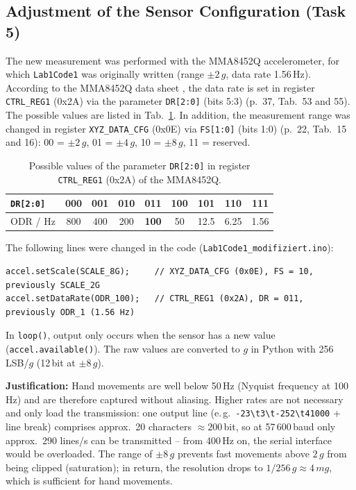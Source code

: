 \documentclass[a4paper,oneside,10pt]{article}
\begin{document}
\subsection{Adjustment of the Sensor Configuration (Task 5)}

The new measurement was performed with the MMA8452Q accelerometer, for which
\texttt{Lab1Code1} was originally written (range $\pm 2\,g$, data rate
1.56\,Hz). According to the MMA8452Q data sheet \cite{mma8452q}, the data rate is set in register
\texttt{CTRL\_REG1} (0x2A) via the parameter \texttt{DR[2:0]} (bits 5:3)
(p.~37, Tab.~53 and 55). The possible values are listed in Tab.~\ref{tab:odr}.
In addition, the measurement range was changed in register \texttt{XYZ\_DATA\_CFG} (0x0E) via
\texttt{FS[1:0]} (bits 1:0) (p.~22, Tab.~15 and 16): 00 = $\pm 2\,g$, 01 = $\pm 4\,g$,
10 = $\pm 8\,g$, 11 = reserved.

\begin{table}[H]
\centering
\small
\caption{Possible values of the parameter \texttt{DR[2:0]} in register \texttt{CTRL\_REG1} (0x2A) of the MMA8452Q.}
\label{tab:odr}
\begin{tabular}{lcccccccc}
\toprule
\texttt{DR[2:0]} & 000 & 001 & 010 & \textbf{011} & 100 & 101 & 110 & 111 \\
\midrule
ODR / Hz & 800 & 400 & 200 & \textbf{100} & 50 & 12.5 & 6.25 & 1.56 \\
\bottomrule
\end{tabular}
\end{table}

The following lines were changed in the code (\texttt{Lab1Code1\_modifiziert.ino}):
\begin{lstlisting}
accel.setScale(SCALE_8G);     // XYZ_DATA_CFG (0x0E), FS = 10, previously SCALE_2G
accel.setDataRate(ODR_100);   // CTRL_REG1 (0x2A), DR = 011, previously ODR_1 (1.56 Hz)
\end{lstlisting}
In \texttt{loop()}, output only occurs when the sensor has a new value
(\texttt{accel.available()}). The raw values are converted to $g$ in Python with 256\,LSB/$g$
(12\,bit at $\pm 8\,g$).

\textbf{Justification:} Hand movements are well below 50\,Hz (Nyquist frequency
at 100\,Hz) and are therefore captured without aliasing. Higher rates are not necessary
and only load the transmission: one output line (e.\,g.\
\texttt{-23\textbackslash t3\textbackslash t-252\textbackslash t41000}
+ line break) comprises approx.\ 20 characters $\approx 200$\,bit, so at 57\,600\,baud
only approx.\ 290 lines/s can be transmitted -- from 400\,Hz on, the serial interface would be
overloaded. The range of $\pm 8\,g$ prevents fast movements above
$2\,g$ from being clipped (saturation); in return, the resolution drops to
$1/256\,g \approx 4\,mg$, which is sufficient for hand movements.
\end{document}
